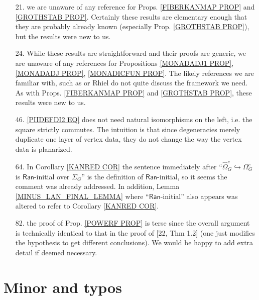 \documentclass{article}
\begin{document}
\begin{itemize}
	\item[21.] we are unaware of any reference for Props. 
	\ref{FIBERKANMAP PROP} and \ref{GROTHSTAB PROP}.
	Certainly these results are elementary enough that they are probably already known (especially Prop. \ref{GROTHSTAB PROP}),
	but the results were new to us. 
	\item[24.] While these results are straightforward 
	and their proofs are generic, 
	we are unaware of any references for Propositions \ref{MONADADJ1 PROP}, \ref{MONADADJ PROP}, \ref{MONADICFUN PROP}. The likely references we are familiar with, such as 
	\cite{Bo94} or {\color{red} Rhiel} do not quite discuss the framework we need.
	As with Props. 
	\ref{FIBERKANMAP PROP} and \ref{GROTHSTAB PROP},
	these results were new to us.
	\item[46.] \eqref{PIIDEFDI2 EQ} does not need natural isomorphisms on the left, i.e. the square strictly commutes. The intuition is that since degeneracies merely duplicate one layer of vertex data, they do not change the way the vertex data is planarized. 
	\item[64.]
	In Corollary \ref{KANRED COR} the sentence immediately after ``$\widehat{\Omega}^e_G \hookrightarrow \Omega^e_G$ is
	$\mathsf{Ran}$-initial over $\Sigma_G$''
	is the definition of $\mathsf{Ran}$-initial,
	so it seems the comment was already addressed.
	In addition, Lemma \ref{MINUS_LAN_FINAL_LEMMA} where ``$\mathsf{Ran}$-initial'' also appears was altered to refer to Corollary \ref{KANRED COR}.
	\item[82.] the proof of Prop. \ref{POWERF PROP} is terse since the overall argument is technically identical to that in the proof of [22, Thm 1.2] (one just modifies the hypothesis to get different conclusions).
	We would be happy to add extra detail if deemed necessary. 
\end{itemize} 


\section{Minor and typos} 
\end{document}
